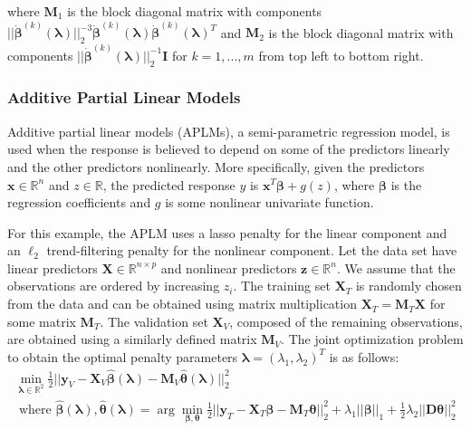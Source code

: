 \documentclass[10pt,letterpaper]{article}
\begin{document}
where $\boldsymbol{M}_1$ is the block diagonal matrix with  components 
$
|| \dot{\boldsymbol{\beta}}^{(k)}(\boldsymbol{\lambda})||_2^{-3} \dot{\boldsymbol{\beta}}^{(k)}(\boldsymbol{\lambda}) \dot{\boldsymbol{\beta}}^{(k)}(\boldsymbol{\lambda})^T
$ and $\boldsymbol{M}_2$ is the block diagonal matrix with components
$||\dot{\boldsymbol{\beta}}^{(k)}(\boldsymbol{\lambda})||_2^{-1} \boldsymbol{I}$
for $k = 1, ..., m$ 
from top left to bottom right.

\subsubsection{Additive Partial Linear Models}

Additive partial linear models (APLMs), a semi-parametric regression model, is used when the response is believed to depend on some of the predictors linearly and the other predictors nonlinearly. More specifically, given the predictors $\boldsymbol x \in \mathbb{R}^{n}$ and $z \in \mathbb{R}$, the predicted response $y$ is $\boldsymbol x^T\boldsymbol \beta + g(z)$, where $\boldsymbol \beta$ is the regression coefficients and $g$ is some nonlinear univariate function.

For this example, the APLM uses a lasso penalty for the linear component and an $\ell_2$ trend-filtering penalty for the nonlinear component. Let the data set have linear predictors $\boldsymbol{X} \in \mathbb{R}^{n \times p}$ and nonlinear predictors $\boldsymbol{z} \in \mathbb{R}^n$. We assume that the observations are ordered by increasing $z_i$. The training set $\boldsymbol{X}_T$ is randomly chosen from the data and can be obtained using matrix multiplication $ \boldsymbol{X}_T = \boldsymbol{M}_T \boldsymbol{X}$ for some matrix $\boldsymbol{M}_T$. The validation set $\boldsymbol{X}_V$, composed of the remaining observations, are obtained using a similarly defined matrix $\boldsymbol{M}_V$.
The joint optimization problem to obtain the optimal penalty parameters $\boldsymbol\lambda = (\lambda_1, \lambda_2)^T$ is as follows:
\begin{equation}
\begin{array}{c}
\min_{\boldsymbol\lambda \in \mathbb{R}^2} \frac{1}{2}
\bigl\lvert\bigl\lvert
\boldsymbol{y}_V
- \boldsymbol{X}_V\hat{\boldsymbol{\beta}}(\boldsymbol{\lambda})
- \boldsymbol{M}_V \hat{\boldsymbol{\theta}}(\boldsymbol{\lambda})
\bigl\rvert\bigl\rvert^2_2 \\
\text{ where } \hat{\boldsymbol{\beta}}(\boldsymbol{\lambda}),
\hat{\boldsymbol{\theta}}(\boldsymbol{\lambda}) =
\arg\min_{\boldsymbol{\beta}, \boldsymbol{\theta}}
\frac{1}{2} \bigl\lvert\bigl\lvert
\boldsymbol{y}_T
- \boldsymbol{X}_T\boldsymbol{\beta}
- \boldsymbol{M}_T \boldsymbol{\theta} \bigl\rvert\bigl\rvert^2_2
+ \lambda_1 \lvert\lvert \boldsymbol{\beta}
\rvert \rvert_1
+ \frac{1}{2} \lambda_2 \lvert\lvert \boldsymbol{D} \boldsymbol{\theta} \rvert \rvert_2^2
\end{array}
\end{equation}
\end{document}
